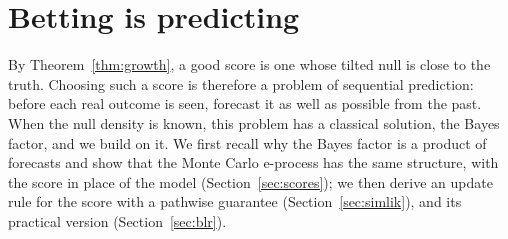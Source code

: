 %
%


\section{Betting is predicting}\label{sec:predictive}

By Theorem~\ref{thm:growth}, a good score is one whose tilted null is close
to the truth. Choosing such a score is therefore a problem of
sequential prediction: before each real outcome is seen, forecast it as well
as possible from the past. When the null density is known, this problem has a
classical solution, the Bayes factor, and we build on it. We first recall why
the Bayes factor is a product of forecasts and show that the Monte Carlo
e-process has the same structure, with the score in place of the model
(Section~\ref{sec:scores}); we then derive an update rule for the score with a
pathwise guarantee (Section~\ref{sec:simlik}), and its practical version
(Section~\ref{sec:blr}).

